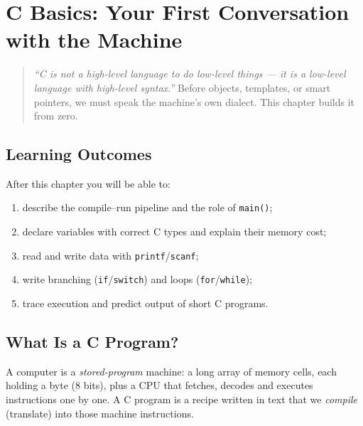 \chapter{C Basics: Your First Conversation with the Machine}
\label{ch:c-basics}

\begin{quote}
\emph{``C is not a high-level language to do low-level things --- it is a low-level language with high-level syntax.''} Before objects, templates, or smart pointers, we must speak the machine's own dialect. This chapter builds it from zero.
\end{quote}

\noindent{}

\section*{Learning Outcomes}
After this chapter you will be able to:
\begin{enumerate}[label=(L\arabic*)]
    \item describe the compile--run pipeline and the role of \texttt{main()};
    \item declare variables with correct C types and explain their memory cost;
    \item read and write data with \texttt{printf}/\texttt{scanf};
    \item write branching (\texttt{if}/\texttt{switch}) and loops (\texttt{for}/\texttt{while});
    \item trace execution and predict output of short C programs.
\end{enumerate}

\section{What Is a C Program?}
\label{sec:what-is-c-program}
A computer is a \emph{stored-program} machine: a long array of memory cells, each holding a byte (8 bits), plus a CPU that fetches, decodes and executes instructions one by one. A C program is a recipe written in text that we \emph{compile} (translate) into those machine instructions.


